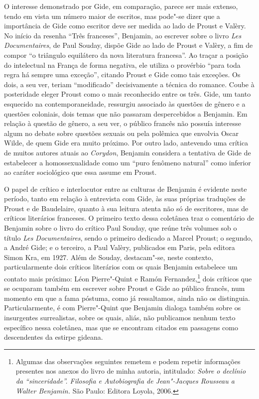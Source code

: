 O interesse demonstrado por Gide, em comparação, parece ser mais
extenso, tendo em vista um número maior de escritos, mas pode"-se dizer
que a importância de Gide como escritor deve ser medida ao lado de
Proust e Valèry. No início da resenha ``Três franceses'', Benjamin, ao
escrever sobre o livro \emph{Les Documentaires}, de Paul Souday, dispõe
Gide ao lado de Proust e Valèry, a fim de compor ``o triângulo
equilátero da nova literatura francesa''. Ao traçar a posição do
intelectual na França de forma negativa, ele utiliza o provérbio ``para
toda regra há sempre uma exceção'', citando Proust e Gide como tais
exceções. Os dois, a seu ver, teriam ``modificado'' decisivamente a
técnica do romance. Coube à posteridade eleger Proust como o mais
reconhecido entre os três. Gide, um tanto esquecido na
contemporaneidade, ressurgiu associado às questões de gênero e a
questões coloniais, dois temas que não passaram despercebidos a
Benjamin. Em relação à questão de gênero, a seu ver, o público francês
não possuía interesse algum no debate sobre questões sexuais ou pela
polêmica que envolvia Oscar Wilde, de quem Gide era muito próximo. Por
outro lado, antevendo uma crítica de muitos autores atuais ao
\emph{Corydon}, Benjamin considera a tentativa de Gide de estabelecer a
homossexualidade como um ``puro fenômeno natural'' como inferior ao
caráter sociológico que essa assume em Proust.

O papel de crítico e interlocutor entre as culturas de Benjamin é
evidente neste período, tanto em relação à entrevista com Gide, às suas
próprias traduções de Proust e de Baudelaire, quanto à sua leitura
atenta não só de escritores, mas de críticos literários franceses. O
primeiro texto dessa coletânea traz o comentário de Benjamin sobre o
livro do crítico Paul Souday, que reúne três volumes sob o título
\emph{Les Documentaires}, sendo o primeiro dedicado a Marcel Proust; o
segundo, a André Gide; e o terceiro, a Paul Valèry, publicados em Paris,
pela editora Simon Kra, em 1927. Além de Souday, destacam"-se, neste
contexto, particularmente dois críticos literários com os quais Benjamin
estabelece um contato mais próximo: Léon Pierre"-Quint e Ramón Fernandez,\footnote{Algumas das observações seguintes remetem e podem repetir
  informações presentes nos anexos do livro de minha autoria,
  intitulado: \emph{Sobre o declínio da ``sinceridade''. Filosofia e
  Autobiografia de Jean"-Jacques Rousseau a Walter Benjamin.} São Paulo:
  Editora Loyola, 2006.} dois críticos que se ocuparam também em
escrever sobre Proust e Gide ao público francês, num momento em que a
fama póstuma, como já ressaltamos, ainda não os distinguia.
Particularmente, é com Pierre"-Quint que Benjamin dialoga também sobre os
insurgentes surrealistas, sobre os quais, aliás, não publicamos nenhum
texto específico nessa coletânea, mas que se encontram citados em
passagens como descendentes da estirpe gideana.


